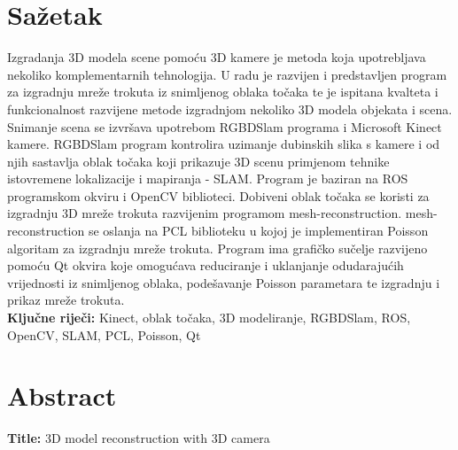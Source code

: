\newpage
\thispagestyle{empty}

\section*{Sažetak} %
\label{sec:Sažetak}


Izgradanja 3D modela scene pomoću 3D kamere je metoda koja upotrebljava
nekoliko komplementarnih tehnologija. U radu je razvijen i predstavljen
program za izgradnju mreže trokuta iz snimljenog oblaka točaka te je
ispitana kvalteta i funkcionalnost razvijene metode izgradnjom nekoliko
3D modela objekata i scena.  Snimanje scena se izvršava upotrebom
RGBDSlam programa i Microsoft Kinect kamere. RGBDSlam program kontrolira
uzimanje dubinskih slika s kamere i od njih sastavlja oblak točaka koji
prikazuje 3D scenu primjenom tehnike istovremene lokalizacije i
mapiranja - SLAM.  Program je baziran na ROS programskom okviru i OpenCV
biblioteci.  Dobiveni oblak točaka se koristi za izgradnju 3D mreže
trokuta razvijenim programom mesh-reconstruction. mesh-reconstruction se
oslanja na PCL biblioteku u kojoj je implementiran Poisson algoritam za
izgradnju mreže trokuta. Program ima grafičko sučelje razvijeno pomoću
Qt okvira koje omogućava reduciranje i uklanjanje odudarajućih
vrijednosti iz snimljenog oblaka, podešavanje Poisson parametara te
izgradnju i prikaz mreže trokuta.  \\

\noindent\textbf{Ključne riječi:} Kinect, oblak točaka, 3D modeliranje,
RGBDSlam, ROS, OpenCV, SLAM, PCL, Poisson, Qt

\section*{Abstract} %
\label{sec:Abstract}
\textbf{Title:} 3D model reconstruction with 3D camera \\

